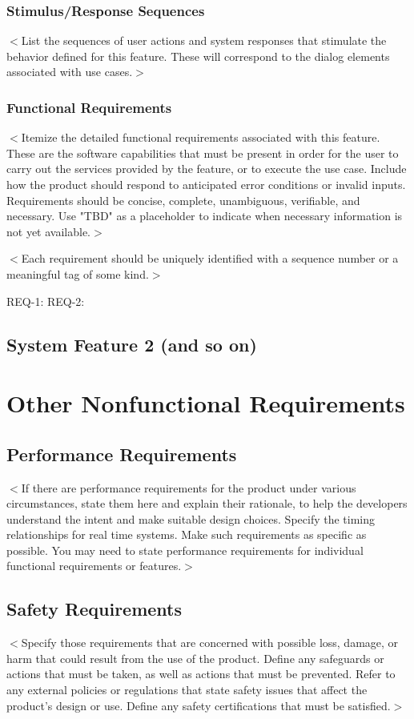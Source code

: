 \documentclass[a4paper, 11pt]{scrreprt}
\begin{document}
\subsection{Stimulus/Response Sequences}
$<$List the sequences of user actions and system responses that stimulate the 
behavior defined for this feature. These will correspond to the dialog elements 
associated with use cases.$>$

\subsection{Functional Requirements}
$<$Itemize the detailed functional requirements associated with this feature.  
These are the software capabilities that must be present in order for the user 
to carry out the services provided by the feature, or to execute the use case.  
Include how the product should respond to anticipated error conditions or 
invalid inputs. Requirements should be concise, complete, unambiguous, 
verifiable, and necessary. Use "TBD" as a placeholder to indicate when necessary 
information is not yet available.$>$

$<$Each requirement should be uniquely identified with a sequence number or a 
meaningful tag of some kind.$>$

REQ-1:	REQ-2:

\section{System Feature 2 (and so on)}


\chapter{Other Nonfunctional Requirements}

\section{Performance Requirements}
$<$If there are performance requirements for the product under various 
circumstances, state them here and explain their rationale, to help the 
developers understand the intent and make suitable design choices. Specify the 
timing relationships for real time systems. Make such requirements as specific 
as possible. You may need to state performance requirements for individual 
functional requirements or features.$>$

\section{Safety Requirements}
$<$Specify those requirements that are concerned with possible loss, damage, or 
harm that could result from the use of the product. Define any safeguards or 
actions that must be taken, as well as actions that must be prevented. Refer to 
any external policies or regulations that state safety issues that affect the 
product's design or use. Define any safety certifications that must be 
satisfied.$>$
\end{document}
